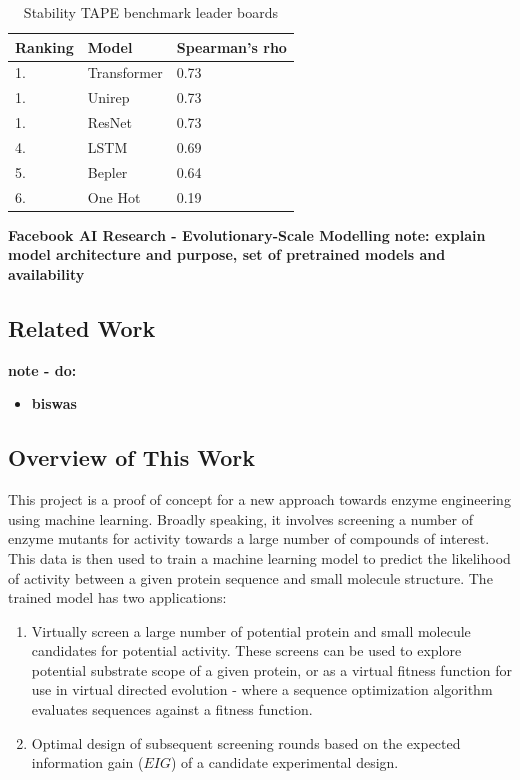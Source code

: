 \documentclass{article}
\begin{document}
\begin{table}
	\begin{center}
		\caption{\label{tapestab} Stability TAPE benchmark leader boards }
		\begin{tabular}{l|p{3cm}|l}
			\textbf{Ranking} & \textbf{Model} & \textbf{Spearman's rho}\\
		\hline 
			 1. & Transformer & 0.73 \\
			 1. & Unirep & 0.73 \\
			 1. & ResNet & 0.73 \\
			 4. & LSTM & 0.69 \\
			 5. & Bepler & 0.64 \\
			 6. & One Hot & 0.19 \\
		\end{tabular}
	\end{center}
\end{table}

\textbf{Facebook AI Research - Evolutionary-Scale Modelling}
\textbf{note: explain model architecture and purpose, set of pretrained models and availability}

\subsection{Related Work}

\textbf{note - do:}
\begin{itemize}
	\item \textbf{biswas}
\end{itemize}

\subsection{Overview of This Work}

This project is a proof of concept for a new approach towards enzyme engineering using machine learning.
Broadly speaking, it involves screening a number of enzyme mutants for activity towards a large number of compounds of interest.
This data is then used to train a machine learning model to predict the likelihood of activity between a given protein sequence and small molecule structure.
The trained model has two applications:
\begin{enumerate}
	\item Virtually screen a large number of potential protein and small molecule candidates for potential activity. 
		These screens can be used to explore potential substrate scope of a given protein, or as a virtual fitness function for use in virtual directed evolution - where a sequence optimization algorithm evaluates sequences against a fitness function.
	\item Optimal design of subsequent screening rounds based on the expected information gain ($EIG$) of a candidate experimental design.
\end{enumerate}
\end{document}
